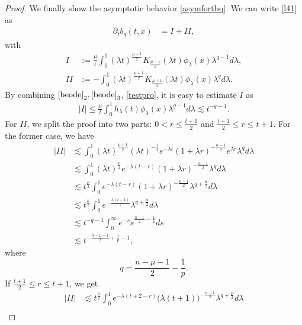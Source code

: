 \documentclass[10pt,a4paper]{amsart}
\begin{document}
\begin{proof}
We finally show the asymptotic behavior \eqref{asymfortbq}. We can write \eqref{l41} as
\begin{equation}\label{l45}
\begin{aligned}
\partial_tb_q(t,x)&=I+II,
\end{aligned}
\end{equation}
with
\[
\begin{aligned}
I&:=\frac{\mu}{t}\int_{0}^{1}(\lambda t)^{\frac{\mu+1}{2}}K_{\frac{\mu-1}{2}}(\lambda t)\phi_\lambda(x)\lambda^{q-1}d\lambda,\\
II&:=-\int_{0}^{1}(\lambda t)^{\frac{\mu+1}{2}}K_{\frac{\mu+1}{2}}(\lambda t)\phi_\lambda(x)\lambda^{q}d\lambda.
\end{aligned}
\]
By combining $\eqref{beode}_2, \eqref{beode}_3$, \eqref{testpro}, it is easy to estimate $I$ as
\begin{equation}
\begin{aligned}
|I|\leq \frac{\mu}{t}\int_{0}^{1}h_\lambda(t)\phi_\lambda(x)\lambda^{q-1}d\lambda\lesssim t^{-q-1}.
\end{aligned}
\end{equation}
For $II$, we split the proof into two parts: $0<r\leq\frac{t+1}{2}$ and $\frac{t+1}{2}\leq r \leq t+1$. For the former case, we have
\begin{equation}
\begin{aligned}
|II|&\lesssim \int_{0}^{1}(\lambda t)^{\frac{\mu+1}{2}}(\lambda t)^{-\frac{1}{2}}e^{-\lambda t}(1+\lambda r)^{-\frac{n-1}{2}}e^{\lambda r}\lambda^{q}d\lambda\\
&\lesssim \int_{0}^{1}(\lambda t)^{\frac{\mu}{2}}e^{-\lambda(t-r)}(1+\lambda r)^{-\frac{n-1}{2}}\lambda^{q}d\lambda\\
&\lesssim t^{\frac{\mu}{2}}\int_{0}^{1}e^{-\lambda(t-r)}(1+\lambda r)^{-\frac{n-1}{2}}\lambda^{q+\frac{\mu}{2}}d\lambda\\
&\lesssim t^{\frac{\mu}{2}}\int_{0}^{1}e^{-\frac{\lambda(t+1)}{2}}\lambda^{q+\frac{\mu}{2}}d\lambda\\
&\lesssim t^{-q-1}\int_{0}^{\infty}e^{-s}s^{\frac{n-1}{2}-\frac{1}{p}}ds\\
&\lesssim t^{-\frac{n-\mu-1}{2}+\frac{1}{p}-1},
\end{aligned}
\end{equation}
where
\[
q=\frac{n-\mu-1}{2}-\frac{1}{p}.
\]
If $\frac{t+1}{2}\leq r \leq t+1$, we get
\begin{equation}
\begin{aligned}
|II|&\lesssim t^{\frac{\mu}{2}}\int_{0}^{1}e^{-\lambda(t+2-r)}\big(\lambda (t+1)\big)^{-\frac{n-1}{2}}\lambda^{q+\frac{\mu}{2}}d\lambda\\

\end{aligned}
\end{equation}
\end{proof}
\end{document}
